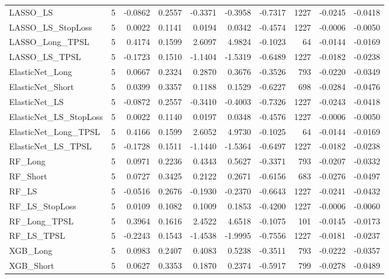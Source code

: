 \begin{tabular}{llrrrrrrrr}
\cline{1-10}
LASSO\_LS & 5 & -0.0862 & 0.2557 & -0.3371 & -0.3958 & -0.7317 & 1227 & -0.0245 & -0.0418 \\
\cline{1-10}
LASSO\_LS\_StopLoss & 5 & 0.0022 & 0.1141 & 0.0194 & 0.0342 & -0.4574 & 1227 & -0.0006 & -0.0050 \\
\cline{1-10}
LASSO\_Long\_TPSL & 5 & 0.4174 & 0.1599 & 2.6097 & 4.9824 & -0.1023 & 64 & -0.0144 & -0.0169 \\
\cline{1-10}
LASSO\_LS\_TPSL & 5 & -0.1723 & 0.1510 & -1.1404 & -1.5319 & -0.6489 & 1227 & -0.0182 & -0.0238 \\
\cline{1-10}
ElasticNet\_Long & 5 & 0.0667 & 0.2324 & 0.2870 & 0.3676 & -0.3526 & 793 & -0.0220 & -0.0349 \\
\cline{1-10}
ElasticNet\_Short & 5 & 0.0399 & 0.3357 & 0.1188 & 0.1529 & -0.6227 & 698 & -0.0284 & -0.0476 \\
\cline{1-10}
ElasticNet\_LS & 5 & -0.0872 & 0.2557 & -0.3410 & -0.4003 & -0.7326 & 1227 & -0.0243 & -0.0418 \\
\cline{1-10}
ElasticNet\_LS\_StopLoss & 5 & 0.0022 & 0.1140 & 0.0197 & 0.0348 & -0.4576 & 1227 & -0.0006 & -0.0050 \\
\cline{1-10}
ElasticNet\_Long\_TPSL & 5 & 0.4166 & 0.1599 & 2.6052 & 4.9730 & -0.1025 & 64 & -0.0144 & -0.0169 \\
\cline{1-10}
ElasticNet\_LS\_TPSL & 5 & -0.1728 & 0.1511 & -1.1440 & -1.5364 & -0.6497 & 1227 & -0.0182 & -0.0238 \\
\cline{1-10}
RF\_Long & 5 & 0.0971 & 0.2236 & 0.4343 & 0.5627 & -0.3371 & 793 & -0.0207 & -0.0332 \\
\cline{1-10}
RF\_Short & 5 & 0.0727 & 0.3425 & 0.2122 & 0.2671 & -0.6156 & 683 & -0.0276 & -0.0497 \\
\cline{1-10}
RF\_LS & 5 & -0.0516 & 0.2676 & -0.1930 & -0.2370 & -0.6643 & 1227 & -0.0241 & -0.0432 \\
\cline{1-10}
RF\_LS\_StopLoss & 5 & 0.0109 & 0.1082 & 0.1009 & 0.1853 & -0.4200 & 1227 & -0.0006 & -0.0060 \\
\cline{1-10}
RF\_Long\_TPSL & 5 & 0.3964 & 0.1616 & 2.4522 & 4.6518 & -0.1075 & 101 & -0.0145 & -0.0173 \\
\cline{1-10}
RF\_LS\_TPSL & 5 & -0.2243 & 0.1543 & -1.4538 & -1.9995 & -0.7556 & 1227 & -0.0181 & -0.0237 \\
\cline{1-10}
XGB\_Long & 5 & 0.0983 & 0.2407 & 0.4083 & 0.5238 & -0.3511 & 793 & -0.0222 & -0.0357 \\
\cline{1-10}
XGB\_Short & 5 & 0.0627 & 0.3353 & 0.1870 & 0.2374 & -0.5917 & 799 & -0.0278 & -0.0489 \\

\end{tabular}
